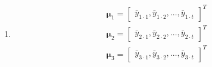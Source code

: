 \documentclass{article}
\begin{document}
\begin{enumerate}[leftmargin = 0 em, label = \arabic*., font = \bfseries]
\begin{enumerate}
		\item 
		\begin{align*}
		\bm \mu_1 = \begin{bmatrix}
			\bar{y}_{1 \cdot 1}, \bar{y}_{1 \cdot 2}, \ldots, \bar{y}_{1 \cdot t}
		\end{bmatrix}^T\\
		\bm \mu_2 = \begin{bmatrix}
			\bar{y}_{2 \cdot 1}, \bar{y}_{2 \cdot 2}, \ldots, \bar{y}_{2 \cdot t}
		\end{bmatrix}^T\\
		\bm \mu_3 = \begin{bmatrix}
			\bar{y}_{3 \cdot 1}, \bar{y}_{3 \cdot 2}, \ldots, \bar{y}_{3 \cdot t}
		\end{bmatrix}^T \\
		\end{align*}

		


		
				
		
		
			\end{enumerate}
		
		
	
	     
\end{enumerate}




	      
\end{document}
